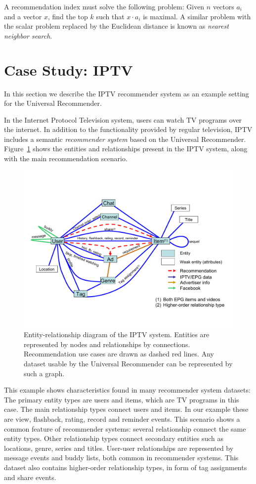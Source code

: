 \documentclass{article}
\begin{document}
A recommendation index must solve the following problem:  Given $n$
vectors $a_i$ and a vector $x$, find the top $k$ such that $x\cdot a_i$
is maximal.  A similar problem with the scalar problem replaced by the
Euclidean distance is known as \emph{nearest neighbor search}.  

\section{Case Study:  IPTV}
In this section we describe the IPTV recommender system as an
example setting for the Universal Recommender. 

In the Internet Protocol Television system, users can watch TV programs
over the internet.  In addition to the functionality provided by regular
television, IPTV includes a semantic \emph{recommender
  system} based on the Universal Recommender. 
Figure~\ref{fig:iptv-er} shows the entities and relationships present in the
IPTV system, along with the main recommendation scenario.  

\begin{figure}
  \centering
  \includegraphics[width=.9\textwidth]{iptv-er}
  \caption{
    Entity-relationship diagram of the IPTV system.  Entities are
    represented by nodes and relationships by connections.
    Recommendation use cases are drawn as dashed red lines. 
    Any dataset usable by the Universal Recommender can be represented
    by such a graph. 
  }
  \label{fig:iptv-er}
\end{figure}

This example shows characteristics found in many recommender system
datasets:  The primary entity types are users and items, which are TV
programs in this case.  The main relationship types connect users and
items.  In our example these are view, flashback, rating, record and
reminder events.  This scenario shows a common feature of recommender systems:
several relationship connect the same entity types.  Other relationship
types connect secondary entities such as locations, genre, series and
titles.  User-user relationships are represented by message events and
buddy lists, both common in recommender systems.  This dataset also
contains higher-order relationship types, in form of tag assignments and
share events. 
\end{document}
